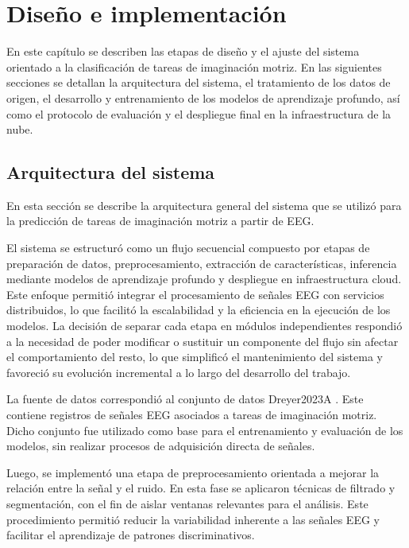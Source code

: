 \chapter{Diseño e implementación} %

\label{Chapter3} %

En este capítulo se describen las etapas de diseño y el ajuste del sistema orientado a la clasificación de tareas de imaginación motriz. En las siguientes secciones se detallan la arquitectura del sistema, el tratamiento de los datos de origen, el desarrollo y entrenamiento de los modelos de aprendizaje profundo, así como el protocolo de evaluación y el despliegue final en la infraestructura de la nube.

\section{Arquitectura del sistema}

En esta sección se describe la arquitectura general del sistema que se utilizó para la predicción de tareas de imaginación motriz a partir de EEG.

El sistema se estructuró como un flujo secuencial compuesto por etapas de preparación de datos, preprocesamiento, extracción de características, inferencia mediante modelos de aprendizaje profundo y despliegue en infraestructura cloud. Este enfoque permitió integrar el procesamiento de señales EEG con servicios distribuidos, lo que facilitó la escalabilidad y la eficiencia en la ejecución de los modelos. La decisión de separar cada etapa en módulos independientes respondió a la necesidad de poder modificar o sustituir un componente del flujo sin afectar el comportamiento del resto, lo que simplificó el mantenimiento del sistema y favoreció su evolución incremental a lo largo del desarrollo del trabajo.

La fuente de datos correspondió al conjunto de datos Dreyer2023A \cite{dreyer2023large}. Este contiene registros de señales EEG asociados a tareas de imaginación motriz. Dicho conjunto fue utilizado como base para el entrenamiento y evaluación de los modelos, sin realizar procesos de adquisición directa de señales.

Luego, se implementó una etapa de preprocesamiento orientada a mejorar la relación entre la señal y el ruido. En esta fase se aplicaron técnicas de filtrado y segmentación, con el fin de aislar ventanas relevantes para el análisis. Este procedimiento permitió reducir la variabilidad inherente a las señales EEG y facilitar el aprendizaje de patrones discriminativos.

